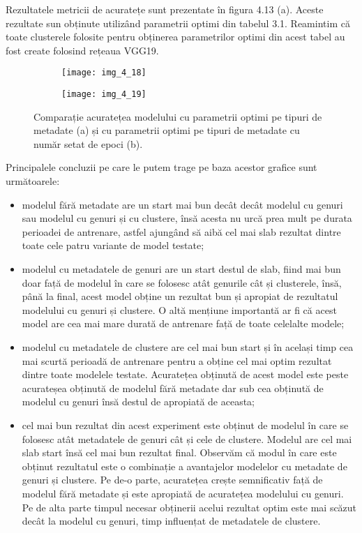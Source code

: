 Rezultatele metricii de acuratețe sunt prezentate în figura 4.13 (a). Aceste rezultate sun obținute utilizând parametrii optimi din tabelul 3.1. Reamintim că toate clusterele folosite pentru obținerea parametrilor optimi din acest tabel au fost create folosind rețeaua VGG19.
\begin{figure}[!h]
  \begin{subfigure}[b]{0.5\textwidth}
    \texttt{[image: img\_4\_18]}
    \caption{}
    \label{fig:f1}
  \end{subfigure}
  \hfill
  \begin{subfigure}[b]{0.5\textwidth}
    \texttt{[image: img\_4\_19]}
    \caption{}
    \label{fig:f2}
  \end{subfigure}
  \caption[Comparație acuratețea modelului cu parametrii optimi pe tipuri de metadate]{Comparație acuratețea modelului cu parametrii optimi pe tipuri de metadate (a) și cu parametrii optimi pe tipuri de metadate cu număr setat de epoci (b).}
\end{figure}
Principalele concluzii pe care le putem trage pe baza acestor grafice sunt următoarele:
\begin{itemize}
	\item modelul fără metadate are un start mai bun decât decât modelul cu genuri sau modelul cu genuri și cu clustere, însă acesta nu urcă prea mult pe durata perioadei de antrenare, astfel ajungând să aibă cel mai slab rezultat dintre toate cele patru variante de model testate;
	\item modelul cu metadatele de genuri are un start destul de slab, fiind mai bun doar față de modelul în care se folosesc atât genurile cât și clusterele, însă, până la final, acest model obține un rezultat bun și apropiat de rezultatul modelului cu genuri și clustere. O altă mențiune importantă ar fi că acest model are cea mai mare durată de antrenare față de toate celelalte modele;
	\item modelul cu metadatele de clustere are cel mai bun start și în același timp cea mai scurtă perioadă de antrenare pentru a obține cel mai optim rezultat dintre toate modelele testate. Acuratețea obținută de acest model este peste acurateșea obținută de modelul fără metadate dar sub cea obținută de modelul cu genuri însă destul de apropiată de aceasta;
	\item cel mai bun rezultat din acest experiment este obținut de modelul în care se folosesc atât metadatele de genuri cât și cele de clustere. Modelul are cel mai slab start însă cel mai bun rezultat final. Observăm că modul în care este obținut rezultatul este o combinație a avantajelor modelelor cu metadate de genuri și clustere. Pe de-o parte, acuratețea crește semnificativ față de modelul fără metadate și este apropiată de acuratețea modelului cu genuri. Pe de alta parte timpul necesar obținerii acelui rezultat optim este mai scăzut decât la modelul cu genuri, timp influențat de metadatele de clustere.
\end{itemize}

